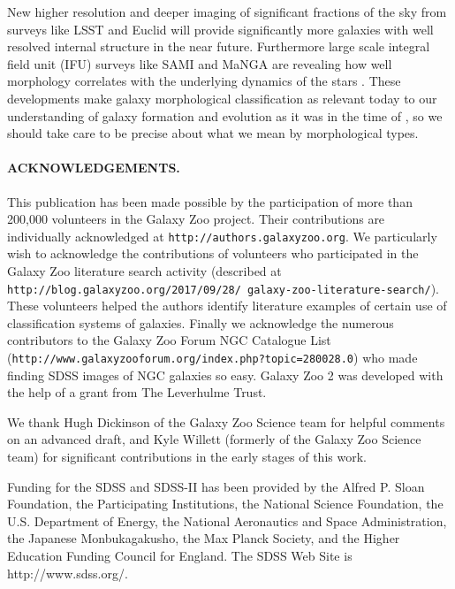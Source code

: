 \documentclass[usenatbib]{mn2e}
\begin{document}
 New higher resolution and deeper imaging of significant fractions of the sky from surveys like LSST and Euclid will provide significantly more galaxies with well resolved internal structure in the near future. Furthermore large scale integral field unit (IFU) surveys like SAMI \citep{Bryant2015} and MaNGA \citep{Bundy2015} are revealing how well morphology correlates with the underlying dynamics of the stars \citep{Foster2018}. These developments make galaxy morphological classification as relevant today to our understanding of galaxy formation and evolution as it was in the time of \citet{Hubble1926}, so we should take care to be precise about what we mean by morphological types. 
  
\paragraph*{ACKNOWLEDGEMENTS.} 

This publication has been made possible by the participation of more than 200,000 volunteers in the Galaxy Zoo project. Their contributions are individually acknowledged at \texttt{http://authors.galaxyzoo.org}.  We particularly wish to acknowledge the contributions of volunteers who participated in the Galaxy Zoo literature search activity (described at {\tt http://blog.galaxyzoo.org/2017/09/28/ galaxy-zoo-literature-search/}). These volunteers helped the authors identify literature examples of certain use of classification systems of galaxies. Finally we acknowledge the numerous contributors to the Galaxy Zoo Forum NGC Catalogue List ({\tt http://www.galaxyzooforum.org/index.php?topic=280028.0}) who made finding SDSS images of NGC galaxies so easy. Galaxy Zoo 2 was developed with the help of a grant from The Leverhulme Trust.

We thank Hugh Dickinson of the Galaxy Zoo Science team for helpful comments on an advanced draft, and Kyle Willett (formerly of the Galaxy Zoo Science team) for significant contributions in the early stages of this work. 

Funding for the SDSS and SDSS-II has been provided by the Alfred P. Sloan Foundation, the Participating Institutions, the National Science Foundation, the U.S. Department of Energy, the National Aeronautics and Space Administration, the Japanese Monbukagakusho, the Max Planck Society, and the Higher Education Funding Council for England. The SDSS Web Site is http://www.sdss.org/. 
\end{document}
